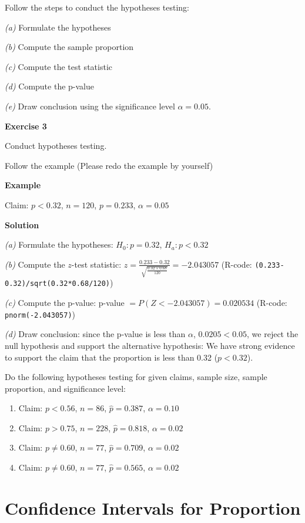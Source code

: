 \documentclass[
]{book}
\begin{document}
Follow the steps to conduct the hypotheses testing:

\emph{(a)} Formulate the hypotheses

\emph{(b)} Compute the sample proportion

\emph{(c)} Compute the test statistic

\emph{(d)} Compute the p-value

\emph{(e)} Draw conclusion using the significance level \(\alpha=0.05\).

\textbf{Exercise 3}

Conduct hypotheses testing.

Follow the example (Please redo the example by yourself)

\textbf{Example}

Claim: \(p<0.32\), \(n=120\), \(p=0.233\), \(\alpha=0.05\)

\textbf{Solution}

\emph{(a)} Formulate the hypotheses: \(H_0: p=0.32\), \(H_a: p<0.32\)

\emph{(b)} Compute the \(z\)-test statistic: \(z = \frac{0.233-0.32}{\sqrt{\frac{0.32 \times 0.68}{120}}} = -2.043057\) (R-code: \texttt{(0.233-0.32)/sqrt(0.32*0.68/120)})

\emph{(c)} Compute the p-value: p-value \(= P(Z < -2.043057) = 0.020534\) (R-code: \texttt{pnorm(-2.043057)})

\emph{(d)} Draw conclusion: since the p-value is less than \(\alpha\), \(0.0205 < 0.05\), we reject the null hypothesis and support the alternative hypothesis: We have strong evidence to support the claim that the proportion is less than 0.32 (\(p<0.32\)).

Do the following hypotheses testing for given claims, sample size, sample proportion, and significance level:

\begin{enumerate}
\def\labelenumi{\arabic{enumi}.}
\item
  Claim: \(p<0.56\), \(n=86\), \(\hat{p}=0.387\), \(\alpha=0.10\)
\item
  Claim: \(p>0.75\), \(n=228\), \(\hat{p}=0.818\), \(\alpha=0.02\)
\item
  Claim: \(p \neq 0.60\), \(n=77\), \(\hat{p}=0.709\), \(\alpha=0.02\)
\item
  Claim: \(p \neq 0.60\), \(n=77\), \(\hat{p}=0.565\), \(\alpha=0.02\)
\end{enumerate}

\chapter{Confidence Intervals for Proportion}\label{confidence-intervals-for-proportion}
\end{document}
